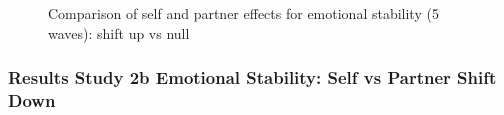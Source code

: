\documentclass[
  singlecolumn]{article}
\begin{document}
\begin{figure}


\caption{\label{fig-results-emotional-stability-self-partner-up-long-comparison}Comparison
of self and partner effects for emotional stability (5 waves): shift up
vs null}

\end{figure}%

\newpage{}

\subsubsection{Results Study 2b Emotional Stability: Self vs Partner
Shift
Down}\label{results-study-2b-emotional-stability-self-vs-partner-shift-down}
\end{document}
